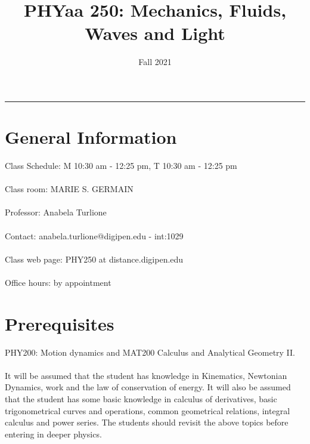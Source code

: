 \documentclass[12pt]{article}
\title{PHYaa 250: Mechanics, Fluids, Waves and Light}
\author{Fall 2021}
\date{}
\newcommand{\blankline}{\quad\pagebreak[2]}
\begin{document}
\maketitle









\hrule



\section*{General Information }

Class Schedule:  M 10:30 am - 12:25 pm, T 10:30 am - 12:25 pm\\ 
\\
Class room: 	MARIE S. GERMAIN\\
\\
Professor: Anabela Turlione\\
\\
Contact: anabela.turlione@digipen.edu - int:1029\\
\\
Class web page: PHY250 at distance.digipen.edu\\
\\
Office hours: by appointment\\

\section*{Prerequisites }
 PHY200: Motion dynamics and MAT200 Calculus and Analytical Geometry II.\\
\\
It will be assumed that the student has knowledge in Kinematics, Newtonian Dynamics, work and the law of conservation of 
energy.	
It will also be assumed that the student has some basic knowledge in calculus of derivatives, 
basic trigonometrical curves and operations, common geometrical relations, integral calculus and power series. 
The students should revisit the above topics before entering in deeper physics.
\end{document}
